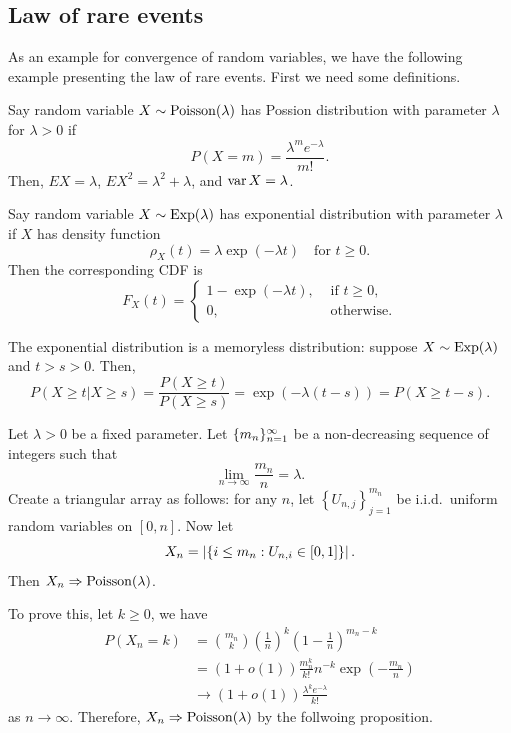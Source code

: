 \documentclass[a4paper]{article}
\newcommand{\convd}{\Rightarrow}
\begin{document}
\subsection{Law of rare events}

As an example for convergence of random variables, we have the following
example presenting the law of rare events. First we need some definitions.

\begin{defi}
  Say random variable $X \sim \operatorname{Poisson} (\lambda)$ has Possion distribution 
  with parameter $\lambda$ for $\lambda > 0$ if 
  \[
  P \left( X = m \right) = \frac{\lambda^m e^{- \lambda}}{m!}.
  \]
  Then, $E X = \lambda$, $E X^2 = \lambda^2 + \lambda$, and 
  $\operatorname{var} X = \lambda$.
\end{defi}

\begin{defi}
  Say random variable $X \sim \operatorname{Exp} (\lambda)$ has exponential distribution
  with parameter $\lambda$ if $X$ has density function 
  \[
  \rho_X (t) = \lambda \exp (- \lambda t) \quad \text{for $t \geq 0$.}
  \]
  Then the corresponding CDF is 
  \[
  F_X (t) = \begin{cases}
    1 - \exp (- \lambda t), & \text{ if $t \geq 0$,} \\
    0, & \text{ otherwise.}
  \end{cases}
  \]
\end{defi}

The exponential distribution is a memoryless distribution: suppose 
$X \sim \operatorname{Exp} (\lambda)$ and $t > s > 0$. Then, 
\[
P \left( X \geq t | X \geq s \right)
= \frac{P \left( X \geq t \right)}{P \left( X \geq s \right)}
= \exp (- \lambda (t - s)) 
= P \left( X \geq t - s \right).
\]

\begin{eg}
  Let $\lambda > 0$ be a fixed parameter. Let $\{ m_n \}_{n=1}^\infty$ 
  be a non-decreasing sequence of integers such that 
  \[
  \lim_{n \to \infty} \frac{m_n}{n} = \lambda.
  \]
  Create a triangular array as follows: for any $n$, 
  let $\left\{ U_{n, j} \right\}_{j=1}^{m_n}$ be i.i.d.\ uniform random 
  variables on $[0, n]$. Now let
  \[
  X_n = \left\lvert  \left\{ i \leq m_n : U_{n, i} \in [0, 1] \right\} \right\rvert.
  \]
  Then $X_n \convd \Poisson (\lambda)$.

  To prove this, let $k \geq 0$, we have
  \begin{align*}
    P (X_n = k) 
    &= \binom{m_n}{k} \left( \frac{1}{n} \right)^k 
    \left( 1 - \frac{1}{n} \right)^{m_n - k} \\
    &= (1 + o(1)) \frac{m_n^k}{k!} n^{-k} \exp \left( - \frac{m_n}{n} \right) \\
    &\to (1 + o(1)) \frac{\lambda^k e^{- \lambda}}{k!}
  \end{align*}
  as $n \to \infty$. Therefore, $X_n \convd \Poisson (\lambda)$ by the 
  follwoing proposition.

\end{eg}
\end{document}
